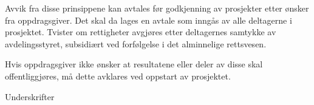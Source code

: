 \documentclass[11pt,a4paper]{report}
\begin{document}
Avvik fra disse prinsippene kan avtales før godkjenning av prosjekter etter ønsker fra oppdragsgiver. Det skal da lages en avtale som inngås av alle deltagerne i prosjektet. Tvister om rettigheter avgjøres etter deltagernes samtykke av avdelingsstyret, subsidiært ved forfølgelse i det alminnelige rettsvesen. 

Hvis oppdragsgiver ikke ønsker at resultatene eller deler av disse skal offentliggjøres, må dette avklares ved oppstart av prosjektet.


\vspace{1cm}
\begin{center}
Underskrifter
\end{center}
\end{document}
